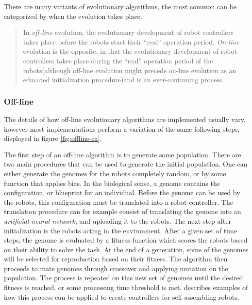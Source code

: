 There are many variants of evolutionary algorithms, the most common can be categorized by when the evolution takes place\cite{eiben_embodied_2010}.
\begin{quote} 
	In \emph{off-line} evolution, the evolutionary development of robot controllers takes place before the robots start their “real” operation period.
	\emph{On-line} evolution is the opposite, in that the evolutionary development of robot controllers takes place during the “real” operation period of the robots(although off-line evolution might precede on-line evolution as an educated initialization procedure)and is an ever-continuing process.\cite{eiben_embodied_2010}
\end{quote} 


\subsubsection*{Off-line}
The details of how off-line evolutionary algorithms are implemented usually vary, however most implementations perform a variation of the same following steps\cite{doncieux_evolutionary_2011}, displayed in figure \ref{fig:offline-ea}. 

The first step of an off-line algorithm is to generate some population.
There are two main procedures that can be used to generate the initial population.	 
One can either generate the genomes for the robots completely random, or by some function that applies bias.
In the biological sense, a genome contains the configuration, or blueprint for an individual.
Before the genome can be used by the robots, this configuration must be translated into a robot controller.
The translation procedure can for example consist of translating the genome into an \emph{artificial neural network}, and uploading it to the robots.
The next step after initialization is the robots acting in the environment.
After a given set of time steps, the genome is evaluated by a fitness function which scores the robots based on their ability to solve the task.	 
At the end of a generation, some of the genomes will be selected for reproduction based on their fitness.	 
The algorithm then proceeds to mate genomes through crossover and applying mutation on the population.	 
The process is repeated on this new set of genomes until the desired fitness is reached, or some processing time threshold is met.
\cite{trianni_evolving_2004, li_co-evolution_2015} describes examples of how this process can be applied to create controllers for self-assembling robots. 

